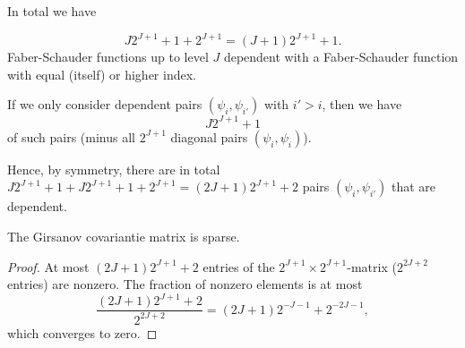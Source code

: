 \documentclass[12pt]{article}
\begin{document}
In total we have 

\[
J2^{J+1}+1+2^{J+1}=(J+1)2^{J+1}+1. 
\]
Faber-Schauder functions up to level \(J\) dependent with a Faber-Schauder function with equal (itself) or higher index. 


If we only consider dependent pairs \((\psi_i,\psi_{i'})\) with \(i'>i\), then we have 
\[
J2^{J+1}+1
\]
of such pairs (minus all \(2^{J+1}\) diagonal pairs \((\psi_i,\psi_i)\)).

Hence, by symmetry, there are in total \(J2^{J+1}+1+J2^{J+1}+1+2^{J+1}=(2J+1)2^{J+1}+2\) pairs \((\psi_i,\psi_{i'})\) that are dependent.

\begin{lemma}
	The Girsanov covariantie matrix is sparse.
\end{lemma}
\begin{proof}
	At most \((2J+1)2^{J+1}+2\) entries of the \(2^{J+1}\times 2^{J+1}\)-matrix (\(2^{2J+2}\) entries) are nonzero. The fraction of nonzero elements is at most
	\[
	\frac{(2J+1)2^{J+1}+2}{2^{2J+2}}=(2J+1)2^{-J-1}+2^{-2J-1},
	\]
	which converges to zero. 
\end{proof}
\end{document}
